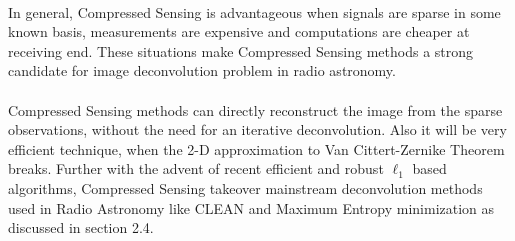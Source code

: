 \paragraph{}In general, Compressed Sensing is advantageous when signals are sparse in some known basis, measurements are expensive and 
computations are cheaper at receiving end. These situations make Compressed Sensing methods a strong candidate for image 
deconvolution problem in radio astronomy. 
\paragraph{}Compressed Sensing methods can directly reconstruct the image from the sparse observations, without the need 
for an iterative deconvolution. Also it will be very efficient technique, when the 2-D approximation to Van Cittert-Zernike Theorem
breaks. Further with the advent of recent efficient and robust $\ell_1$ based algorithms, Compressed Sensing
takeover mainstream deconvolution methods used in Radio Astronomy like CLEAN and Maximum Entropy minimization as discussed 
in section 2.4. 











